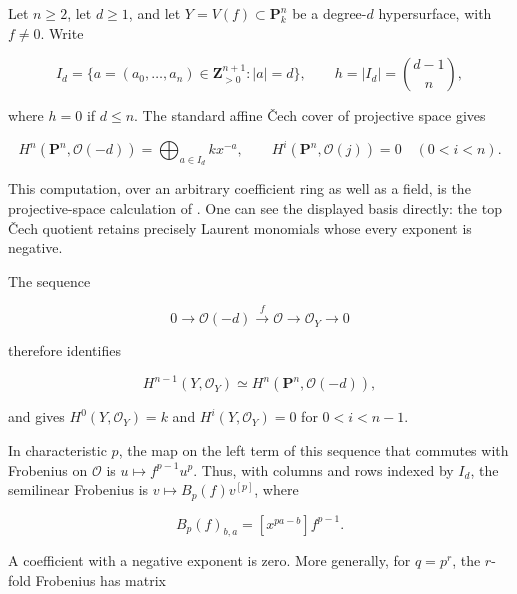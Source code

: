 \documentclass[11pt]{article}
\begin{document}
Let \(n\geq2\), let \(d\geq1\), and let
\(Y=V(f)\subset\mathbf P^n_k\) be a degree-\(d\) hypersurface, with
\(f\neq0\). Write

\begin{equation}
 I_d=\{a=(a_0,\ldots,a_n)\in\mathbf Z_{>0}^{n+1}:|a|=d\},\qquad
 h=|I_d|=\binom{d-1}{n},                                                 \label{eq:pn-1-1}
\end{equation}

where \(h=0\) if \(d\leq n\). The standard affine Čech cover of projective
space gives

\begin{equation}
 H^n(\mathbf P^n,\mathcal O(-d))
 =\bigoplus_{a\in I_d} kx^{-a},
 \qquad H^i(\mathbf P^n,\mathcal O(j))=0\quad(0<i<n).                     \label{eq:pn-1-2}
\end{equation}

This computation, over an arbitrary coefficient ring as well as a field, is the projective-space calculation of \citet[Lemma 30.8.1, Tag 01XT]{StacksProjective}. One can see the displayed basis directly: the top
Čech quotient retains precisely Laurent monomials whose every exponent
is negative.

The sequence

\begin{equation}
 0\longrightarrow\mathcal O(-d)\xrightarrow{\ f\ }
 \mathcal O\longrightarrow\mathcal O_Y\longrightarrow0
\end{equation}

therefore identifies

\begin{equation}
 H^{n-1}(Y,\mathcal O_Y)\simeq H^n(\mathbf P^n,\mathcal O(-d)),            \label{eq:pn-1-3}
\end{equation}

and gives \(H^0(Y,\mathcal O_Y)=k\) and
\(H^i(Y,\mathcal O_Y)=0\) for \(0<i<n-1\).

In characteristic \(p\), the map on the left term of this sequence that
commutes with Frobenius on \(\mathcal O\) is
\(u\mapsto f^{p-1}u^p\). Thus, with columns and rows indexed by \(I_d\),
the semilinear Frobenius is \(v\mapsto B_p(f)v^{[p]}\), where

\begin{equation}
 B_p(f)_{b,a}=[x^{pa-b}]f^{p-1}.                                        \label{eq:pn-1-4}
\end{equation}

A coefficient with a negative exponent is zero. More generally, for
\(q=p^r\), the \(r\)-fold Frobenius has matrix
\end{document}
